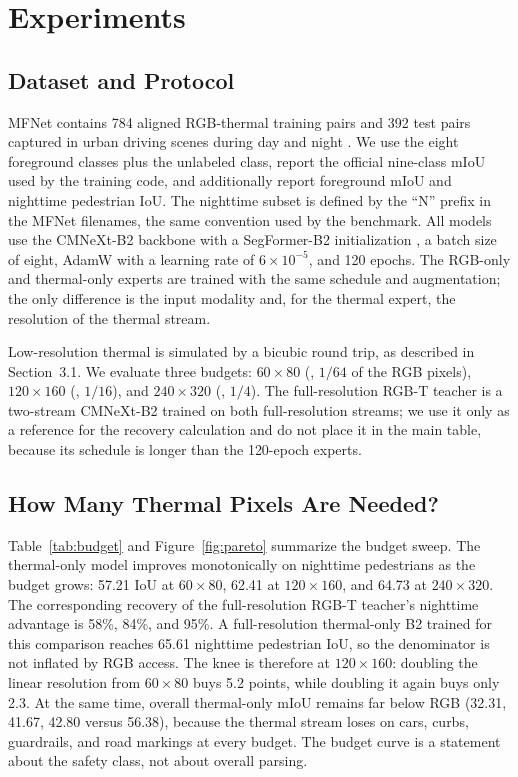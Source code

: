 \section{Experiments}
\label{sec:experiments}

\subsection{Dataset and Protocol}

MFNet contains 784 aligned RGB-thermal training pairs and 392 test pairs captured in
urban driving scenes during day and night \cite{ha2017mfnet}. We use the eight
foreground classes plus the unlabeled class, report the official nine-class mIoU used
by the training code, and additionally report foreground mIoU and nighttime pedestrian
IoU. The nighttime subset is defined by the ``N'' prefix in the MFNet filenames, the
same convention used by the benchmark. All models use the CMNeXt-B2 backbone with a
SegFormer-B2 initialization \cite{xie2021segformer,zhang2023delivering}, a batch size of
eight, AdamW with a learning rate of $6\times10^{-5}$, and 120 epochs. The RGB-only and
thermal-only experts are trained with the same schedule and augmentation; the only
difference is the input modality and, for the thermal expert, the resolution of the
thermal stream.

Low-resolution thermal is simulated by a bicubic round trip, as described in
Section~3.1. We evaluate three budgets: $60\times80$ (, $1/64$ of the RGB
pixels), $120\times160$ (, $1/16$), and $240\times320$ (, $1/4$). The
full-resolution RGB-T teacher is a two-stream CMNeXt-B2 trained on both full-resolution
streams;
we use it only as a reference for the recovery calculation and do not place it in the
main table, because its schedule is longer than the 120-epoch experts.

\subsection{How Many Thermal Pixels Are Needed?}

Table~\ref{tab:budget} and Figure~\ref{fig:pareto} summarize the budget sweep. The
thermal-only model improves monotonically on nighttime pedestrians as the budget grows:
57.21 IoU at $60\times80$, 62.41 at $120\times160$, and 64.73 at $240\times320$. The
corresponding recovery of the full-resolution RGB-T teacher's nighttime advantage is
58\%, 84\%, and 95\%. A full-resolution thermal-only B2 trained for this comparison
reaches 65.61 nighttime pedestrian IoU, so the denominator is not inflated by RGB
access. The knee is therefore at $120\times160$: doubling the linear
resolution from $60\times80$ buys 5.2 points, while doubling it again buys only 2.3.
At the same time, overall thermal-only mIoU remains far below RGB
(32.31, 41.67, 42.80 versus 56.38), because the thermal stream loses on cars, curbs,
guardrails, and road markings at every budget. The budget curve is a statement about
the safety class, not about overall parsing.

